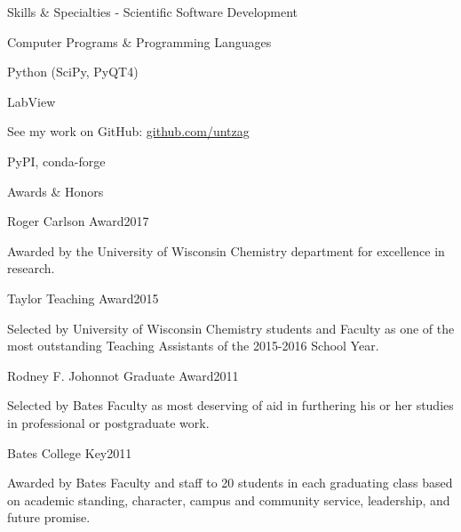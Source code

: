 \documentclass{resume}  %
\begin{document}
\begin{rSection}{Skills \& Specialties - Scientific Software Development} 
  \begin{rSubsection}{Computer Programs \& Programming Languages}{}{}{}
    \item Python (SciPy, PyQT4)
    \item LabView
    \item See my work on GitHub: \href{https://github.com/untzag}{github.com/untzag}
    \item PyPI, conda-forge
  \end{rSubsection}
\end{rSection}

\begin{rSection}{Awards \& Honors}
  \begin{rSubsection}{Roger Carlson Award}{2017}{}{}
	  \item Awarded by the University of Wisconsin Chemistry department for excellence in research.
  \end{rSubsection}
  \begin{rSubsection}{Taylor Teaching Award}{2015}{}{}
    \item  Selected by University of Wisconsin Chemistry students and Faculty as one of the most
      outstanding Teaching Assistants of the 2015-2016 School Year.
  \end{rSubsection}
  \begin{rSubsection}{Rodney F. Johonnot Graduate Award}{2011}{}{}
    \item  Selected by Bates Faculty as most deserving of aid in furthering his or her studies in
      professional or postgraduate work.
  \end{rSubsection}
  \begin{rSubsection}{Bates College Key}{2011}{}{}
    \item Awarded by Bates Faculty and staff to 20 students in each graduating class based on
      academic standing, character, campus and community service, leadership, and future promise.
  \end{rSubsection}
\end{rSection}
\end{document}
